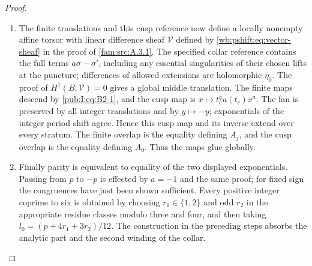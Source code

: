 \begin{proof}
\begin{enumerate}[label=\arabic*.,leftmargin=*]
\item The finite translations and this cusp reference now define a locally nonempty affine torsor with linear difference sheaf $\mathscr V$ defined by \eqref{wb:pshift:eq:vector-sheaf} in the proof of \cref{fam:src:A.3.1}. The specified collar reference contains the full terms $a\sigma-\sigma'$, including any essential singularities of their chosen lifts at the puncture; differences of allowed extensions are holomorphic $\eta_0$. The proof of $H^1(B,\mathscr V)=0$ gives a global middle translation. The finite maps descend by \eqref{pub:I:eq:B2-1}, and the cusp map is $x\mapsto t_c^qu(t_c)x^a$. The fan is preserved by all integer translations and by $y\mapsto-y$; exponentials of the integer period shift agree. Hence this cusp map and its inverse extend over every stratum. The finite overlap is the equality defining $A_j$, and the cusp overlap is the equality defining $A_0$. Thus the maps glue globally.

\item Finally parity is equivalent to equality of the two displayed exponentials. Passing from $p$ to $-p$ is effected by $a=-1$ and the same proof; for fixed sign the congruences have just been shown sufficient. Every positive integer coprime to six is obtained by choosing $r_1\in\{1,2\}$ and odd $r_2$ in the appropriate residue classes modulo three and four, and then taking $l_0=(p+4r_1+3r_2)/12$. The construction in the preceding steps absorbs the analytic part and the second winding of the collar.
\end{enumerate}
\end{proof}
